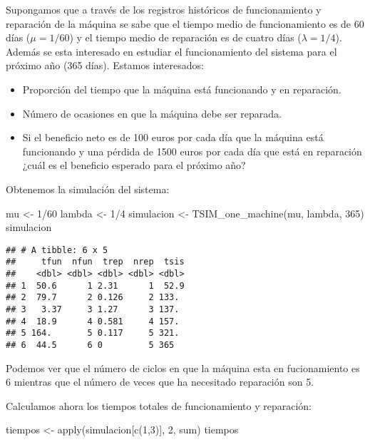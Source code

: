 \documentclass[
]{book}
\newenvironment{Shaded}{\begin{snugshade}}{\end{snugshade}}
\newcommand{\DecValTok}[1]{\textcolor[rgb]{0.00,0.00,0.81}{#1}}
\newcommand{\FunctionTok}[1]{\textcolor[rgb]{0.00,0.00,0.00}{#1}}
\newcommand{\NormalTok}[1]{#1}
\newcommand{\OtherTok}[1]{\textcolor[rgb]{0.56,0.35,0.01}{#1}}
\newcommand{\SpecialCharTok}[1]{\textcolor[rgb]{0.00,0.00,0.00}{#1}}
\providecommand{\tightlist}{%
  \setlength{\itemsep}{0pt}\setlength{\parskip}{0pt}}
\theoremstyle{definition}
\theoremstyle{definition}
\theoremstyle{definition}
\theoremstyle{definition}
\theoremstyle{remark}
\begin{document}
Supongamos que a través de los registros históricos de funcionamiento y reparación de la máquina se sabe que el tiempo medio de funcionamiento es de 60 días (\(\mu = 1/60\)) y el tiempo medio de reparación es de cuatro días (\(\lambda = 1/4\)). Además se esta interesado en estudiar el funcionamiento del sistema para el próximo año (365 días). Estamos interesados:

\begin{itemize}
\tightlist
\item
  Proporción del tiempo que la máquina está funcionando y en reparación.
\item
  Número de ocasiones en que la máquina debe ser reparada.
\item
  Si el beneficio neto es de 100 euros por cada día que la máquina está funcionando y una pérdida de 1500 euros por cada día que está en reparación ¿cuál es el beneficio esperado para el próximo año?
\end{itemize}

Obtenemos la simulación del sistema:

\begin{Shaded}
\begin{Highlighting}[]
\NormalTok{mu }\OtherTok{\textless{}{-}} \DecValTok{1}\SpecialCharTok{/}\DecValTok{60}
\NormalTok{lambda }\OtherTok{\textless{}{-}} \DecValTok{1}\SpecialCharTok{/}\DecValTok{4}
\NormalTok{simulacion }\OtherTok{\textless{}{-}} \FunctionTok{TSIM\_one\_machine}\NormalTok{(mu, lambda, }\DecValTok{365}\NormalTok{)}
\NormalTok{simulacion}
\end{Highlighting}
\end{Shaded}

\begin{verbatim}
## # A tibble: 6 x 5
##     tfun  nfun  trep  nrep  tsis
##    <dbl> <dbl> <dbl> <dbl> <dbl>
## 1  50.6      1 2.31      1  52.9
## 2  79.7      2 0.126     2 133. 
## 3   3.37     3 1.27      3 137. 
## 4  18.9      4 0.581     4 157. 
## 5 164.       5 0.117     5 321. 
## 6  44.5      6 0         5 365
\end{verbatim}

Podemos ver que el número de ciclos en que la máquina esta en fucionamiento es 6 mientras que el número de veces que ha necesitado reparación son 5.

Calculamos ahora los tiempos totales de funcionamiento y reparación:

\begin{Shaded}
\begin{Highlighting}[]
\NormalTok{tiempos }\OtherTok{\textless{}{-}} \FunctionTok{apply}\NormalTok{(simulacion[}\FunctionTok{c}\NormalTok{(}\DecValTok{1}\NormalTok{,}\DecValTok{3}\NormalTok{)], }\DecValTok{2}\NormalTok{, sum)}
\NormalTok{tiempos}
\end{Highlighting}
\end{Shaded}
\end{document}
